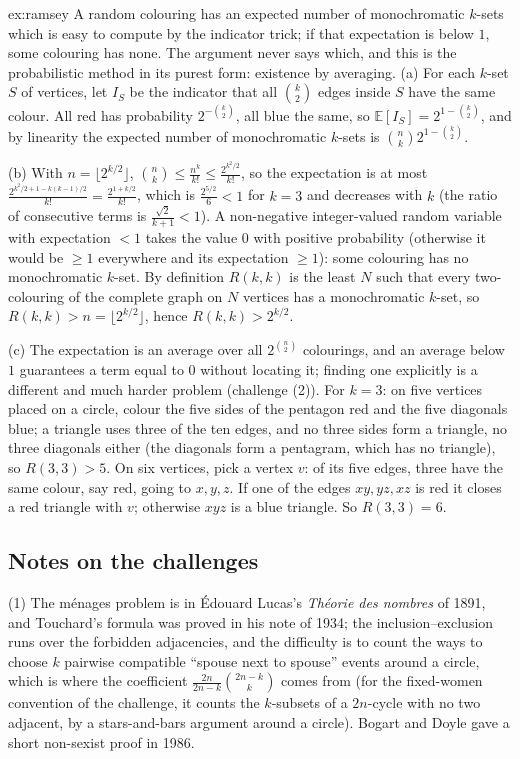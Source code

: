 \begin{solution}{ex:ramsey}
\idea A random colouring has an expected number of monochromatic $k$-sets which is easy to compute by the indicator trick; if that expectation is below $1$, some colouring has none. The argument never says which, and this is the probabilistic method in its purest form: existence by averaging.
\writeup (a) For each $k$-set $S$ of vertices, let $I_S$ be the indicator that all $\binom k2$ edges inside $S$ have the same colour. All red has probability $2^{-\binom k2}$, all blue the same, so $\mathbb E[I_S]=2^{1-\binom k2}$, and by linearity the expected number of monochromatic $k$-sets is $\binom nk2^{1-\binom k2}$.

(b) With $n=\lfloor2^{k/2}\rfloor$, $\binom nk\le\frac{n^k}{k!}\le\frac{2^{k^2/2}}{k!}$, so the expectation is at most $\frac{2^{k^2/2+1-k(k-1)/2}}{k!}=\frac{2^{1+k/2}}{k!}$, which is $\frac{2^{5/2}}6<1$ for $k=3$ and decreases with $k$ (the ratio of consecutive terms is $\frac{\sqrt2}{k+1}<1$). A non-negative integer-valued random variable with expectation $<1$ takes the value $0$ with positive probability (otherwise it would be $\ge1$ everywhere and its expectation $\ge1$): some colouring has no monochromatic $k$-set. By definition $R(k,k)$ is the least $N$ such that every two-colouring of the complete graph on $N$ vertices has a monochromatic $k$-set, so $R(k,k)>n=\lfloor2^{k/2}\rfloor$, hence $R(k,k)>2^{k/2}$.

(c) The expectation is an average over all $2^{\binom n2}$ colourings, and an average below $1$ guarantees a term equal to $0$ without locating it; finding one explicitly is a different and much harder problem (challenge (2)). For $k=3$: on five vertices placed on a circle, colour the five sides of the pentagon red and the five diagonals blue; a triangle uses three of the ten edges, and no three sides form a triangle, no three diagonals either (the diagonals form a pentagram, which has no triangle), so $R(3,3)>5$. On six vertices, pick a vertex $v$: of its five edges, three have the same colour, say red, going to $x,y,z$. If one of the edges $xy,yz,xz$ is red it closes a red triangle with $v$; otherwise $xyz$ is a blue triangle. So $R(3,3)=6$.
\end{solution}

\subsection*{Notes on the challenges}

(1) The m\'enages problem is in \'Edouard Lucas's \emph{Th\'eorie des nombres} of 1891, and Touchard's formula was proved in his note of 1934; the inclusion--exclusion runs over the forbidden adjacencies, and the difficulty is to count the ways to choose $k$ pairwise compatible ``spouse next to spouse'' events around a circle, which is where the coefficient $\frac{2n}{2n-k}\binom{2n-k}k$ comes from (for the fixed-women convention of the challenge, it counts the $k$-subsets of a $2n$-cycle with no two adjacent, by a stars-and-bars argument around a circle). Bogart and Doyle gave a short non-sexist proof in 1986.

